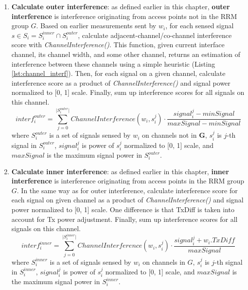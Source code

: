\begin{enumerate}
    \item \textbf{Calculate outer interference}: as defined earlier in this chapter, \textbf{outer interference} is interference originating from access points not in the RRM group $G$.
    Based on earlier measurements sent by $w_i$, for each sensed signal $s \in S_i = S^{inner}_i \cap S^{outer}_i$, calculate adjacent-channel/co-channel interference score with \textit{ChannelInterference()}. This function, given current interface channel, its channel width, and some other channel, returns an estimation of interference between these channels using a simple heuristic (Listing \ref{lst:channel_interf}). Then, for each signal on a given channel, calculate interference score as a product of \textit{ChannelInterference()} and signal power normalized to [0, 1] scale. Finally, sum up interference scores for all signals on this channel.
    \begin{equation}
        interf^{outer}_i = \sum_{j=0}^{\lvert S^{outer}_i \rvert} ChannelInterference(w_i, s^j_i) \cdot \frac{signal^j_i - minSignal}{maxSignal - minSignal}
    \end{equation}
    where $S^{outer}_i$ is a set of signals sensed by $w_i$ on channels not in $\mathbf{G}$, $s^j_i$ is $j$-th signal in $S^{outer}_i$, $signal^j_i$ is power of $s^j_i$ normalized to [0, 1] scale, and $maxSignal$ is the maximum signal power in $S^{outer}_i$.
    \item \textbf{Calculate inner interference}: as defined earlier in this chapter, \textbf{inner interference} is interference originating from access points in the RRM group $G$. In the same way as for outer interference, calculate interference score for each signal on given channel as a product of \textit{ChannelInterference()} and signal power normalized to [0, 1] scale. One difference is that TxDiff is taken into account for Tx power adjustment. Finally, sum up interference scores for all signals on this channel.
    \begin{equation}
        interf^{inner}_i = \sum_{j=0}^{\lvert S^{inner}_i \rvert} ChannelInterference(w_i, s^j_i) \cdot \frac{signal^j_i + w_i.TxDiff}{maxSignal}
    \end{equation}
    where $S^{inner}_i$ is a set of signals sensed by $w_i$ on channels in $G$, $s^j_i$ is $j$-th signal in $S^{inner}_i$, $signal^j_i$ is power of $s^j_i$ normalized to [0, 1] scale, and $maxSignal$ is the maximum signal power in $S^{inner}_i$.
\end{enumerate}

